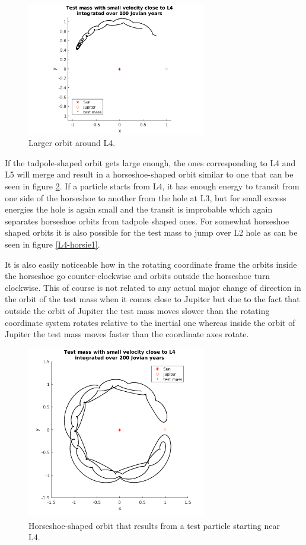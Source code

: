 \documentclass[12pt,a4paper,titlepage]{article}
\begin{document}
\begin{figure}
\centering
\includegraphics[width=0.7\textwidth]{../plots/L4-evenCloserToOrigin.png}
\caption{Larger orbit around L4.}
\label{L4-largertadpole}
\end{figure}

If the tadpole-shaped orbit gets large enough, the ones corresponding to L4 and L5 will merge and result in a horseshoe-shaped orbit similar to one that can be seen in figure \ref{L4-horsie2}. If a particle starts from L4, it has enough energy to transit from one side of the horseshoe to another from the hole at L3, but for small excess energies the hole is again small and the transit is improbable which again separates horseshoe orbits from tadpole shaped ones. For somewhat horseshoe shaped orbits it is also possible for the test mass to jump over L2 hole as can be seen in figure \ref{L4-horsie1}.

It is also easily noticeable how in the rotating coordinate frame the orbits inside the horseshoe go counter-clockwise and orbits outside the horseshoe turn clockwise. This of course is not related to any actual major change of direction in the orbit of the test mass when it comes close to Jupiter but due to the fact that outside the orbit of Jupiter the test mass moves slower than the rotating coordinate system rotates relative to the inertial one whereas inside the orbit of Jupiter the test mass moves faster than the coordinate axes rotate.

\begin{figure}
\centering
\includegraphics[width=0.7\textwidth]{../plots/L4-smallerHorsie.png}
\caption{Horseshoe-shaped orbit that results from a test particle starting near L4.}
\label{L4-horsie2}
\end{figure}
\end{document}
